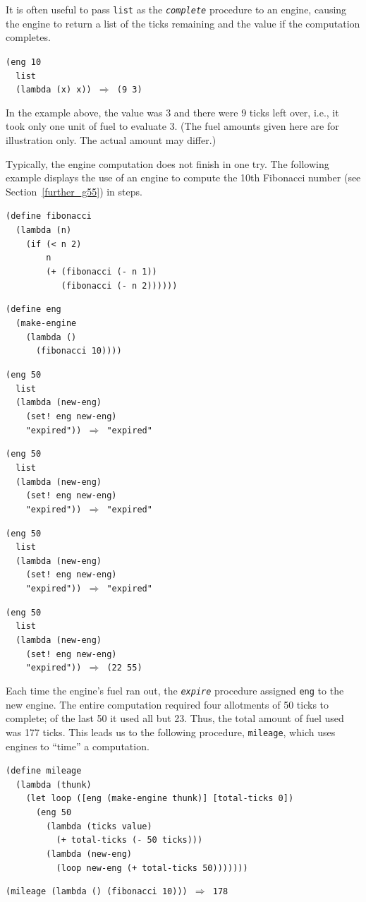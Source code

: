 It is often useful to pass \texttt{list} as the \texttt{\textit{complete}} procedure
to an engine, causing the engine to return a list of the
ticks remaining and the value if the computation completes.


\begin{alltt}
(eng 10
  list
  (lambda (x) x)) \(\Rightarrow\) (9 3)
\end{alltt}


In the example above, the value was 3 and there were 9 ticks left over,
i.e., it took only one unit of fuel to evaluate 3.
(The fuel amounts given here are for illustration only.
The actual amount may differ.)


Typically, the engine computation does not finish in one try.
\label{examples_s92}The following example displays the use of an engine to
compute the 10th Fibonacci number (see Section \ref{further_g55})
in steps.


\begin{alltt}
(define fibonacci
  (lambda (n)
    (if (\textless{} n 2)
        n
        (+ (fibonacci (- n 1))
           (fibonacci (- n 2))))))

(define eng
  (make-engine
    (lambda ()
      (fibonacci 10))))

(eng 50
  list
  (lambda (new-eng)
    (set! eng new-eng)
    "expired")) \(\Rightarrow\) "expired"

(eng 50
  list
  (lambda (new-eng)
    (set! eng new-eng)
    "expired")) \(\Rightarrow\) "expired"

(eng 50
  list
  (lambda (new-eng)
    (set! eng new-eng)
    "expired")) \(\Rightarrow\) "expired"

(eng 50
  list
  (lambda (new-eng)
    (set! eng new-eng)
    "expired")) \(\Rightarrow\) (22 55)
\end{alltt}


Each time the engine's fuel ran out, the \texttt{\textit{expire}} procedure assigned
\texttt{eng} to the new engine.
The entire computation required four allotments of 50 ticks to complete; of the
last 50 it used all but 23.
Thus, the total amount of fuel used was 177 ticks.
This leads us to the following procedure, \texttt{mileage}, which
uses engines to ``time'' a computation.


\begin{alltt}
(define mileage
  (lambda (thunk)
    (let loop ([eng (make-engine thunk)] [total-ticks 0])
      (eng 50
        (lambda (ticks value)
          (+ total-ticks (- 50 ticks)))
        (lambda (new-eng)
          (loop new-eng (+ total-ticks 50)))))))

(mileage (lambda () (fibonacci 10))) \(\Rightarrow\) 178
\end{alltt}


